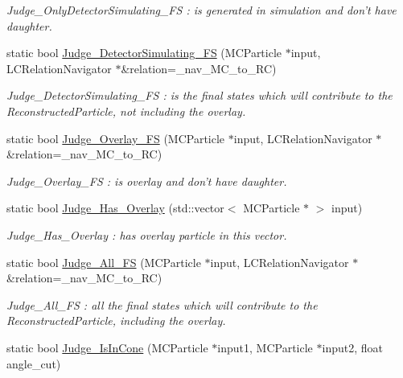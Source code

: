\begin{DoxyCompactItemize}
\begin{DoxyCompactList}\small\item\em Judge\_\-OnlyDetectorSimulating\_\-FS : is generated in simulation and don't have daughter. \item\end{DoxyCompactList}\item 
static bool \hyperlink{classToolSet_1_1CMC_a15a940ad524f57e93daa4c23a54c5992}{Judge\_\-DetectorSimulating\_\-FS} (MCParticle $\ast$input, LCRelationNavigator $\ast$\&relation=\_\-nav\_\-MC\_\-to\_\-RC)
\begin{DoxyCompactList}\small\item\em Judge\_\-DetectorSimulating\_\-FS : is the final states which will contribute to the ReconstructedParticle, not including the overlay. \item\end{DoxyCompactList}\item 
static bool \hyperlink{classToolSet_1_1CMC_a7230e73142fa3a3a5b2952f11556022c}{Judge\_\-Overlay\_\-FS} (MCParticle $\ast$input, LCRelationNavigator $\ast$\&relation=\_\-nav\_\-MC\_\-to\_\-RC)
\begin{DoxyCompactList}\small\item\em Judge\_\-Overlay\_\-FS : is overlay and don't have daughter. \item\end{DoxyCompactList}\item 
static bool \hyperlink{classToolSet_1_1CMC_a257af2810ec961f3e1a71f29bc12154f}{Judge\_\-Has\_\-Overlay} (std::vector$<$ MCParticle $\ast$ $>$ input)
\begin{DoxyCompactList}\small\item\em Judge\_\-Has\_\-Overlay : has overlay particle in this vector. \item\end{DoxyCompactList}\item 
static bool \hyperlink{classToolSet_1_1CMC_ad5ee7a4ddd73dca280d23d5656ac106d}{Judge\_\-All\_\-FS} (MCParticle $\ast$input, LCRelationNavigator $\ast$\&relation=\_\-nav\_\-MC\_\-to\_\-RC)
\begin{DoxyCompactList}\small\item\em Judge\_\-All\_\-FS : all the final states which will contribute to the ReconstructedParticle, including the overlay. \item\end{DoxyCompactList}\item 
static bool \hyperlink{classToolSet_1_1CMC_a63e419bc0a7ce9d4573476d8432e84cb}{Judge\_\-IsInCone} (MCParticle $\ast$input1, MCParticle $\ast$input2, float angle\_\-cut)

\end{DoxyCompactItemize}
